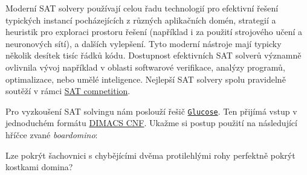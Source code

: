 Moderní SAT solvery používají celou řadu technologií pro efektivní řešení typických instancí pocházejících z různých aplikačních domén, strategií a heuristik pro exploraci prostoru řešení (například i za použití strojového učení a neuronových sítí), a dalších vylepšení. Tyto moderní nástroje mají typicky několik desítek tisíc řádků kódu. Dostupnost efektivních SAT solverů významně ovlivnila vývoj například v oblasti softwarové verifikace, analýzy programů, optimalizace, nebo umělé inteligence. Nejlepší SAT solvery spolu pravidelně soutěží v rámci \href{http://www.satcompetition.org}{SAT competition}.

Pro vyzkoušení SAT solvingu nám poslouží řešič \href{https://github.com/mi-ki/glucose-syrup}{\texttt{Glucose}}. Ten přijímá vstup v jednoduchém formátu \href{http://people.sc.fsu.edu/~jburkardt/data/cnf/cnf.html}{DIMACS CNF}. Ukažme si postup použití na následující hříčce zvané \emph{boardomino}:

\begin{example}[Boardomino]
Lze pokrýt šachovnici s chybějícími dvěma protilehlými rohy perfektně pokrýt kostkami domina?    
\end{example}

